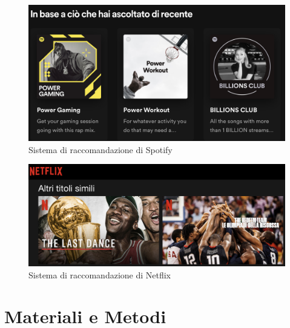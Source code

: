 \documentclass{report}
\begin{document}
    \begin{figure}[h]
            \centering
            \includegraphics[width=1\linewidth]{screenshot/spotify_example.png}
            \caption{Sistema di raccomandazione di Spotify}
            \label{fig:enter-label}
        \end{figure}
    \begin{figure}[h]
            \centering
            \includegraphics[width=1\linewidth]{screenshot/netflix_example.png}
            \caption{Sistema di raccomandazione di Netflix}
            \label{fig:enter-label}
        \end{figure}

\newpage
\chapter{Materiali e Metodi}
\end{document}
